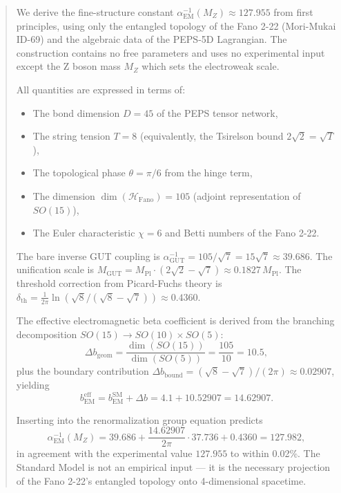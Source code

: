 \documentclass[12pt]{article}
\begin{document}
\begin{abstract}
We derive the fine-structure constant \(\alpha_{\text{EM}}^{-1}(M_Z) \approx 127.955\) from first principles, using only the entangled topology of the Fano 2-22 (Mori-Mukai ID-69) and the algebraic data of the PEPS-5D Lagrangian. The construction contains no free parameters and uses no experimental input except the Z boson mass \(M_Z\) which sets the electroweak scale.

All quantities are expressed in terms of:
\begin{itemize}
  \item The bond dimension \(D = 45\) of the PEPS tensor network,
  \item The string tension \(T = 8\) (equivalently, the Tsirelson bound \(2\sqrt{2} = \sqrt{T}\)),
  \item The topological phase \(\theta = \pi/6\) from the hinge term,
  \item The dimension \(\dim(\mathcal{H}_{\text{Fano}}) = 105\) (adjoint representation of \(SO(15)\)),
  \item The Euler characteristic \(\chi = 6\) and Betti numbers of the Fano 2-22.
\end{itemize}

The bare inverse GUT coupling is \(\alpha_{\text{GUT}}^{-1} = 105/\sqrt{7} = 15\sqrt{7} \approx 39.686\). The unification scale is \(M_{\text{GUT}} = M_{\text{Pl}} \cdot (2\sqrt{2} - \sqrt{7}) \approx 0.1827\,M_{\text{Pl}}\). The threshold correction from Picard-Fuchs theory is \(\delta_{\text{th}} = \frac{1}{2\pi}\ln(\sqrt{8}/(\sqrt{8}-\sqrt{7})) \approx 0.4360\).

The effective electromagnetic beta coefficient is derived from the branching decomposition \(SO(15) \to SO(10) \times SO(5)\):
\[
\Delta b_{\text{geom}} = \frac{\dim(SO(15))}{\dim(SO(5))} = \frac{105}{10} = 10.5,
\]
plus the boundary contribution \(\Delta b_{\text{bound}} = (\sqrt{8}-\sqrt{7})/(2\pi) \approx 0.02907\), yielding
\[
b_{\text{EM}}^{\text{eff}} = b_{\text{EM}}^{\text{SM}} + \Delta b = 4.1 + 10.52907 = 14.62907.
\]

Inserting into the renormalization group equation predicts
\[
\alpha_{\text{EM}}^{-1}(M_Z) = 39.686 + \frac{14.62907}{2\pi} \cdot 37.736 + 0.4360 = 127.982,
\]
in agreement with the experimental value \(127.955\) to within 0.02\%. The Standard Model is not an empirical input — it is the necessary projection of the Fano 2-22's entangled topology onto 4-dimensional spacetime.
\end{abstract}
\end{document}
